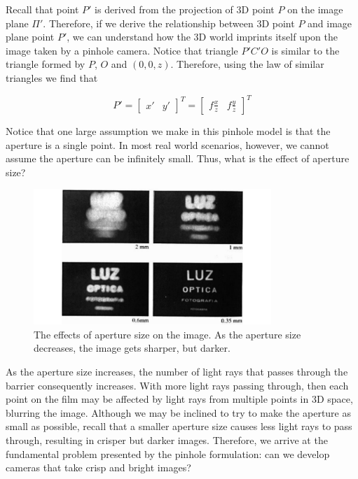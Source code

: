 \documentclass[a4paper, 12pt]{article}
\begin{document}
Recall that point $P'$ is derived from the projection of 3D point $P$ on the image plane $\Pi'$. Therefore, if we derive the relationship between 3D point $P$ and image plane point $P'$, we can understand how the 3D world imprints itself upon the image taken by a pinhole camera. Notice that triangle $P'C'O$ is similar to the triangle formed by $P$, $O$ and $(0,0,z)$. Therefore, using the law of similar triangles we find that 

\begin{equation}
    P' = \begin{bmatrix}x'&y'\end{bmatrix}^T = \begin{bmatrix}f\frac{x}{z} & f\frac{y}{z}\end{bmatrix}^T
\end{equation}

Notice that one large assumption we make in this pinhole model is that the aperture is a single point. In most real world scenarios, however, we cannot assume the aperture can be infinitely small. Thus, what is the effect of aperture size? 

\begin{figure}[h!]
\centering
\includegraphics[width=0.8\textwidth]{figures/1-3.pdf}
\caption{The effects of aperture size on the image. As the aperture size decreases, the image gets sharper, but darker.}
\label{fig:apertureSize}
\end{figure}

As the aperture size increases, the number of light rays that passes through the barrier consequently increases. With more light rays passing through, then each point on the film may be affected by light rays from multiple points in 3D space, blurring the image. Although we may be inclined to try to make the aperture as small as possible, recall that a smaller aperture size causes less light rays to pass through, resulting in crisper but darker images. Therefore, we arrive at the fundamental problem presented by the pinhole formulation: can we develop cameras that take crisp and bright images?
\end{document}
